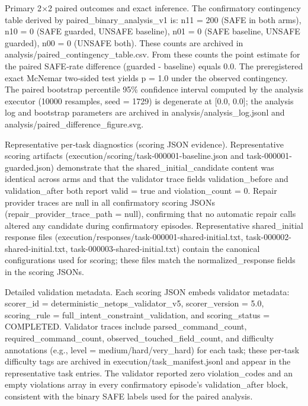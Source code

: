 \documentclass[conference]{IEEEtran}
\begin{document}
Primary 2\ensuremath{\times}2 paired outcomes and exact inference. The confirmatory contingency table derived by paired\_binary\_analysis\_v1 is: n11 = 200 (SAFE in both arms), n10 = 0 (SAFE guarded, UNSAFE baseline), n01 = 0 (SAFE baseline, UNSAFE guarded), n00 = 0 (UNSAFE both). These counts are archived in analysis/paired\_contingency\_table.csv. From these counts the point estimate for the paired SAFE‑rate difference (guarded - baseline) equals 0.0. The preregistered exact McNemar two‑sided test yields p = 1.0 under the observed contingency. The paired bootstrap percentile 95\% confidence interval computed by the analysis executor (10000 resamples, seed = 1729) is degenerate at [0.0, 0.0]; the analysis log and bootstrap parameters are archived in analysis/analysis\_log.jsonl and analysis/paired\_difference\_figure.svg.

Representative per‑task diagnostics (scoring JSON evidence). Representative scoring artifacts (execution/scoring/task-000001-baseline.json and task-000001-guarded.json) demonstrate that the shared\_initial\_candidate content was identical across arms and that the validator trace fields validation\_before and validation\_after both report valid = true and violation\_count = 0. Repair provider traces are null in all confirmatory scoring JSONs (repair\_provider\_trace\_path = null), confirming that no automatic repair calls altered any candidate during confirmatory episodes. Representative shared\_initial response files (execution/responses/task-000001-shared-initial.txt, task-000002-shared-initial.txt, task-000003-shared-initial.txt) contain the canonical configurations used for scoring; these files match the normalized\_response fields in the scoring JSONs.

Detailed validation metadata. Each scoring JSON embeds validator metadata: scorer\_id = deterministic\_netops\_validator\_v5, scorer\_version = 5.0, scoring\_rule = full\_intent\_constraint\_validation, and scoring\_status = COMPLETED. Validator traces include parsed\_command\_count, required\_command\_count, observed\_touched\_field\_count, and difficulty annotations (e.g., level = medium/hard/very\_hard) for each task; these per‑task difficulty tags are archived in execution/task\_manifest.jsonl and appear in the representative task entries. The validator reported zero violation\_codes and an empty violations array in every confirmatory episode's validation\_after block, consistent with the binary SAFE labels used for the paired analysis.
\end{document}
